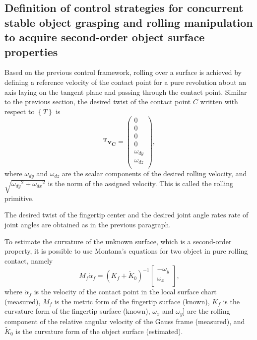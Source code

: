 \subsection{Definition of control strategies for concurrent stable object grasping and rolling manipulation to acquire second-order object surface properties}
\label{sec:rolling}

Based on the previous control framework, rolling over a surface is achieved by defining a reference velocity of the contact point for a pure revolution about an axis laying on the tangent plane and passing through the contact point. Similar to the previous section, the desired twist of the contact point $C$ written with respect to $\left\lbrace T \right\rbrace$ is
\begin{equation}
    \bm{^Tv_C}=\left(
    \begin{array}{c}
        0\\
        0\\
        0\\
        0\\
        \omega_{dy}\\
        \omega_{dz}\\
    \end{array}\right),
\end{equation}
where $\omega_{dy}$ and $\omega_{dz}$ are the scalar components of the desired rolling velocity, and $\sqrt{{\omega_{dy}}^2+{\omega_{dx}}^2}$ is the norm of the assigned velocity. This is called the rolling primitive.

The desired twist of the fingertip center and the desired joint angle rates rate of joint angles are obtained as in the previous paragraph.

To estimate the curvature of the unknown surface, which is a second-order property, it is possible to use Montana's equations for two object in pure rolling contact, namely
\begin{equation}
M_f \dot{\alpha}_f=(K_f+\tilde{K}_0)^{-1}
\left[
\begin{array}{c}
-\omega_y\\
\omega_x\\
\end{array}
\right],
\label{eq:montana}
\end{equation}
where $\dot{\alpha}_f$ is the velocity of the contact point in the local surface chart (measured), $M_f$ is the metric form of the fingertip surface (known), $K_f$ is the curvature form of the fingertip surface (known), $\omega_x$ and $\omega_y$] are the rolling component of the relative angular velocity of the Gauss frame (measured), and $\tilde{K}_0$ is the curvature form of the object surface (estimated).


